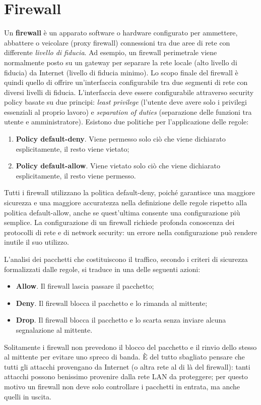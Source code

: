 \chapter{Firewall}
Un \textbf{firewall} è un apparato software o hardware configurato per ammettere, abbattere o veicolare (proxy firewall) connessioni tra due aree di rete con differente \textit{livello di fiducia}. Ad esempio, un firewall perimetrale viene normalmente posto su un gateway per separare la rete locale (alto livello di fiducia) da Internet (livello di fiducia minimo). Lo scopo finale del firewall è quindi quello di offrire un'interfaccia configurabile tra due segmenti di rete con diversi livelli di fiducia. L'interfaccia deve essere configurabile attraverso security policy basate su due principi: \textit{least privilege} (l'utente deve avere solo i privilegi essenziali al proprio lavoro) e \textit{separation of duties} (separazione delle funzioni tra utente e amministratore). Esistono due politiche per l'applicazione delle regole:
\begin{enumerate}
	\item \textbf{Policy default-deny}. Viene permesso solo ciò che viene dichiarato esplicitamente, il resto viene vietato;
	\item \textbf{Policy default-allow}. Viene vietato solo ciò che viene dichiarato esplicitamente, il resto viene permesso.
\end{enumerate}
Tutti i firewall utilizzano la politica default-deny, poiché garantisce una maggiore sicurezza e una maggiore accuratezza nella definizione delle regole rispetto alla politica default-allow, anche se quest'ultima consente una configurazione più semplice. La configurazione di un firewall richiede profonda conoscenza dei protocolli di rete e di network security: un errore nella configurazione può rendere inutile il suo utilizzo.

L'analisi dei pacchetti che costituiscono il traffico, secondo i criteri di sicurezza formalizzati dalle regole, si traduce in una delle seguenti azioni:
\begin{itemize}
	\item \textbf{Allow}. Il firewall lascia passare il pacchetto;
	\item \textbf{Deny}. Il firewall blocca il pacchetto e lo rimanda al mittente;
	\item \textbf{Drop}. Il firewall blocca il pacchetto e lo scarta senza inviare alcuna segnalazione al mittente.
\end{itemize}
Solitamente i firewall non prevedono il blocco del pacchetto e il rinvio dello stesso al mittente per evitare uno spreco di banda. È del tutto sbagliato pensare che tutti gli attacchi provengano da Internet (o altra rete al di là del firewall): tanti attacchi possono benissimo provenire dalla rete LAN da proteggere; per questo motivo un firewall non deve solo controllare i pacchetti in entrata, ma anche quelli in uscita.

